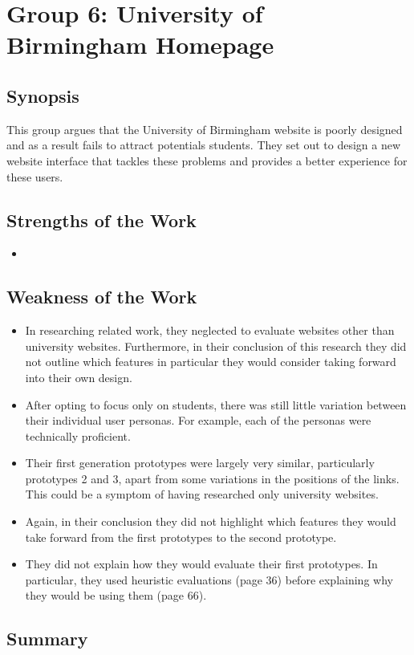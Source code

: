 \section{Group 6: University of Birmingham Homepage}

\subsection{Synopsis}

This group argues that the University of Birmingham website is poorly designed
and as a result fails to attract potentials students. They set out to design a
new website interface that tackles these problems and provides a better
experience for these users.

\subsection{Strengths of the Work}

\begin{itemize}
	\item
\end{itemize}

\subsection{Weakness of the Work}

\begin{itemize}

	\item  In researching related work, they neglected to evaluate websites
	other than university websites. Furthermore, in their conclusion of this
	research they did not outline which features in particular they would
	consider taking forward into their own design.

	\item After opting to focus only on students, there was still little
	variation between their individual user personas. For example, each of the
	personas were technically proficient.

	\item Their first generation prototypes were largely very similar,
	particularly prototypes 2 and 3, apart from some variations in the
	positions of the links.  This could be a symptom of having researched only
	university websites.

	\item Again, in their conclusion they did not highlight which features they
	would take forward from the first prototypes to the second prototype.

	\item They did not explain how they would evaluate their first prototypes.
	In particular, they used heuristic evaluations (page 36) before explaining
	why they would be using them (page 66).

\end{itemize}

\subsection{Summary}
